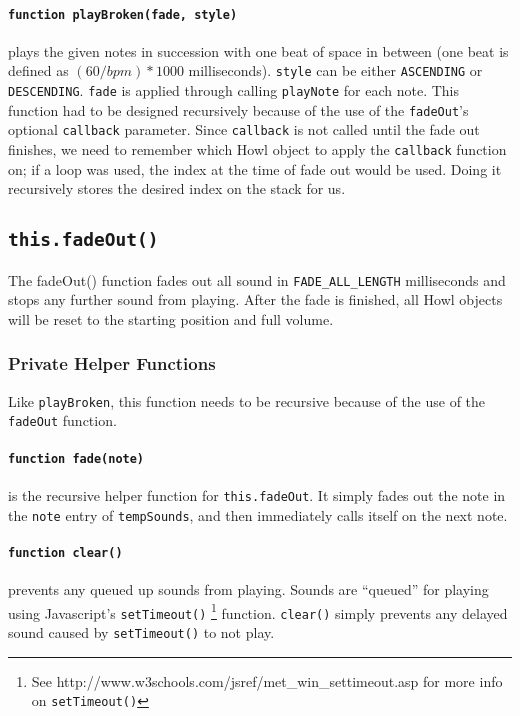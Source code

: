 \documentclass{article}
\begin{document}
\paragraph{\texttt{function playBroken(fade, style)}} plays the given notes in succession with one beat of space in between (one beat is defined as $(60/bpm)*1000$ milliseconds). \texttt{style} can be either \texttt{ASCENDING} or \texttt{DESCENDING}. \texttt{fade} is applied through calling \texttt{playNote} for each note. This function had to be designed recursively because of the use of the \texttt{fadeOut}'s optional \texttt{callback} parameter. Since \texttt{callback} is not called until the fade out finishes, we need to remember which Howl object to apply the \texttt{callback} function on; if a loop was used, the index at the time of fade out would be used. Doing it recursively stores the desired index on the stack for us.

\subsection{\texttt{this.fadeOut()}}
The fadeOut() function fades out all sound in \texttt{FADE\_ALL\_LENGTH} milliseconds and stops any further sound from playing. After the fade is finished, all Howl objects will be reset to the starting position and full volume.

\subsubsection{Private Helper Functions} Like \texttt{playBroken}, this function needs to be recursive because of the use of the \texttt{fadeOut} function.

\paragraph{\texttt{function fade(note)}} is the recursive helper function for \texttt{this.fadeOut}. It simply fades out the note in the \texttt{note} entry of \texttt{tempSounds}, and then immediately calls itself on the next note.

\paragraph{\texttt{function clear()}} prevents any queued up sounds from playing. Sounds are ``queued'' for playing using Javascript's \texttt{setTimeout()} \footnote{See http://www.w3schools.com/jsref/met\_win\_settimeout.asp for more info on \texttt{setTimeout()}} function. \texttt{clear()} simply prevents any delayed sound caused by \texttt{setTimeout()} to not play.
\end{document}
